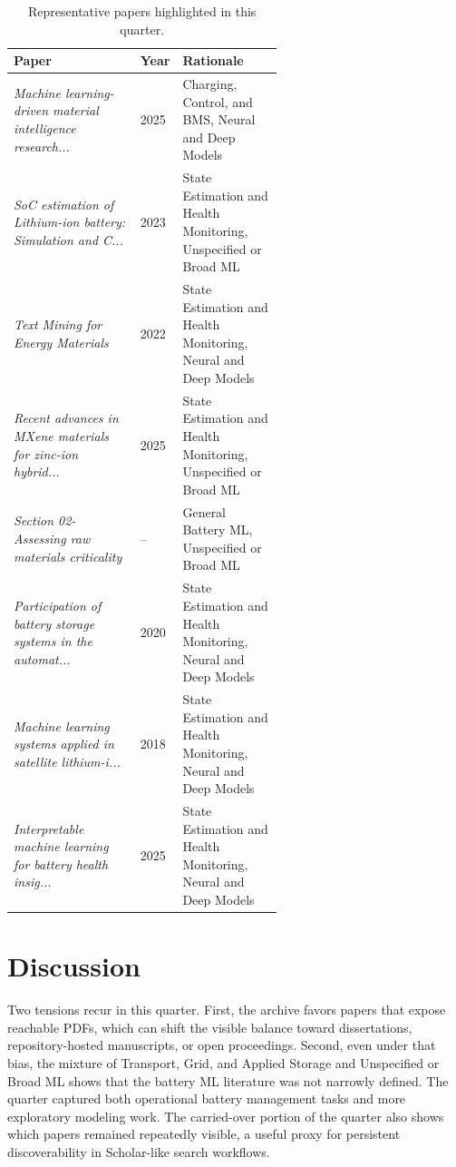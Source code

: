 \documentclass[conference]{IEEEtran}
\begin{document}
\begin{table}[t]
\caption{Representative papers highlighted in this quarter.}
\label{tab:notable}
\centering
\footnotesize
\begin{tabularx}{\linewidth}{p{0.47\linewidth} p{0.12\linewidth} X}
\toprule
Paper & Year & Rationale \\
\midrule
\textit{Machine learning-driven material intelligence research...} \cite{machinelearningdriven2025} & 2025 & Charging, Control, and BMS, Neural and Deep Models \\
\textit{SoC estimation of Lithium-ion battery: Simulation and C...} \cite{socestimationof2023} & 2023 & State Estimation and Health Monitoring, Unspecified or Broad ML \\
\textit{Text Mining for Energy Materials} \cite{textminingfor2022} & 2022 & State Estimation and Health Monitoring, Neural and Deep Models \\
\textit{Recent advances in MXene materials for zinc-ion hybrid...} \cite{recentadvancesin2025} & 2025 & State Estimation and Health Monitoring, Unspecified or Broad ML \\
\textit{Section 02-Assessing raw materials criticality} \cite{section02assessingna} & -- & General Battery ML, Unspecified or Broad ML \\
\textit{Participation of battery storage systems in the automat...} \cite{participationofbattery2020} & 2020 & State Estimation and Health Monitoring, Neural and Deep Models \\
\textit{Machine learning systems applied in satellite lithium-i...} \cite{machinelearningsystems2018} & 2018 & State Estimation and Health Monitoring, Neural and Deep Models \\
\textit{Interpretable machine learning for battery health insig...} \cite{interpretablemachinelear2025} & 2025 & State Estimation and Health Monitoring, Neural and Deep Models \\
\bottomrule
\end{tabularx}
\end{table}

\section{Discussion}
Two tensions recur in this quarter. First, the archive favors papers that expose reachable PDFs, which can shift the visible balance toward dissertations, repository-hosted manuscripts, or open proceedings. Second, even under that bias, the mixture of Transport, Grid, and Applied Storage and Unspecified or Broad ML shows that the battery ML literature was not narrowly defined. The quarter captured both operational battery management tasks and more exploratory modeling work. The carried-over portion of the quarter also shows which papers remained repeatedly visible, a useful proxy for persistent discoverability in Scholar-like search workflows.
\end{document}
